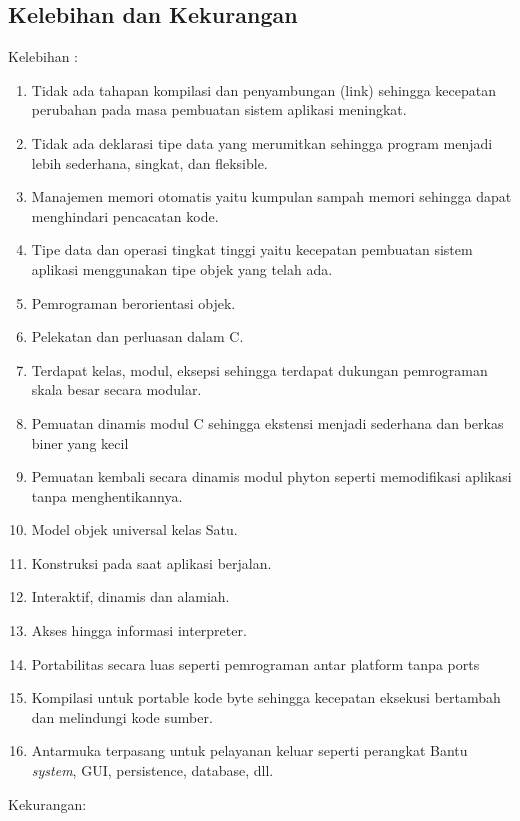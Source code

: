 \subsection{Kelebihan dan Kekurangan}
Kelebihan :
\begin{enumerate}
\item Tidak ada tahapan kompilasi dan penyambungan (link) sehingga kecepatan perubahan pada masa pembuatan sistem aplikasi meningkat.
\item Tidak ada deklarasi tipe data yang merumitkan sehingga program menjadi lebih sederhana, singkat, dan fleksible.
\item Manajemen memori otomatis yaitu kumpulan sampah memori sehingga dapat menghindari pencacatan kode.
\item Tipe data dan operasi tingkat tinggi yaitu kecepatan pembuatan sistem aplikasi menggunakan tipe objek yang telah ada.
\item Pemrograman berorientasi objek.
\item Pelekatan dan perluasan dalam C.
\item Terdapat kelas, modul, eksepsi sehingga terdapat dukungan pemrograman skala besar secara modular.
\item Pemuatan dinamis modul C sehingga ekstensi menjadi sederhana dan berkas biner yang kecil
\item Pemuatan kembali secara dinamis modul phyton seperti memodifikasi aplikasi tanpa menghentikannya.
\item Model objek universal kelas Satu.
\item Konstruksi pada saat aplikasi berjalan.
\item Interaktif, dinamis dan alamiah.
\item Akses hingga informasi interpreter.
\item Portabilitas secara luas seperti pemrograman antar platform tanpa ports
\item Kompilasi untuk portable kode byte sehingga kecepatan eksekusi bertambah dan melindungi kode sumber.
\item Antarmuka terpasang untuk pelayanan keluar seperti perangkat Bantu \textit{system}, GUI, persistence, database, dll.
\end{enumerate}
Kekurangan:
